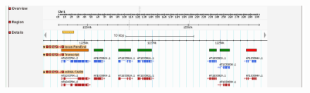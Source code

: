 \begin{figure}[h]
\centering
\includegraphics[width=6in]{Assets/Graphics/ParsEval/figure-3.png}
\caption{~}
\label{Fig:ParsEval3}
\end{figure}
